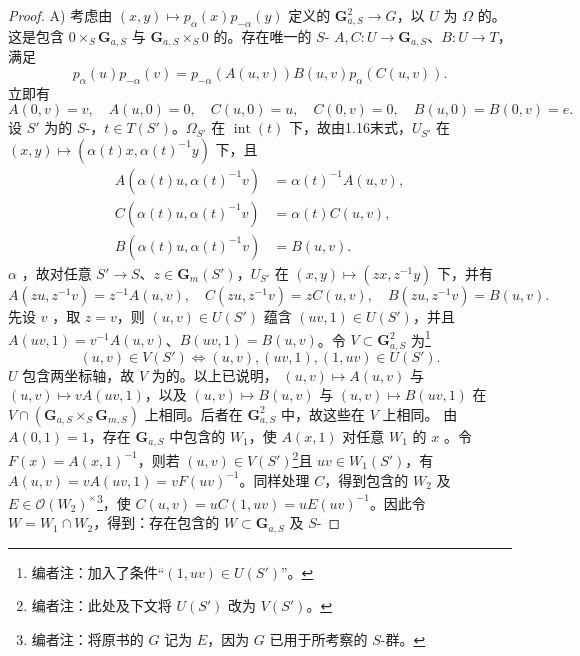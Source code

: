 \begin{proof}
A) 考虑由 $(x,y)\mapsto p_\alpha(x)p_{-\alpha}(y)$ 定义的 $\mathbf G_{a,S}^2\to G$，以 $U$ 为 $\Omega$ 的。这是包含 $0\times_S\mathbf G_{a,S}$ 与 $\mathbf G_{a,S}\times_S0$ 的。存在唯一的 $S$- $A,C:U\to\mathbf G_{a,S}$、$B:U\to T$，满足
\[p_\alpha(u)p_{-\alpha}(v)=p_{-\alpha}(A(u,v))B(u,v)p_\alpha(C(u,v)).\]
立即有
\[A(0,v)=v,\quad A(u,0)=0,\quad C(u,0)=u,\quad C(0,v)=0,\quad B(u,0)=B(0,v)=e.\]
设 $S'$ 为的 $S$-，$t\in T(S')$。$\Omega_{S'}$ 在 $\operatorname{int}(t)$ 下，故由1.16末式，$U_{S'}$ 在 $(x,y)\mapsto(\alpha(t)x,\alpha(t)^{-1}y)$ 下，且
\[\begin{aligned}A(\alpha(t)u,\alpha(t)^{-1}v)&=\alpha(t)^{-1}A(u,v),\\C(\alpha(t)u,\alpha(t)^{-1}v)&=\alpha(t)C(u,v),\\B(\alpha(t)u,\alpha(t)^{-1}v)&=B(u,v).\end{aligned}\]
$\alpha$ ，故对任意 $S'\to S$、$z\in\mathbf G_m(S')$，$U_{S'}$ 在 $(x,y)\mapsto(zx,z^{-1}y)$ 下，并有
\[A(zu,z^{-1}v)=z^{-1}A(u,v),\quad C(zu,z^{-1}v)=zC(u,v),\quad B(zu,z^{-1}v)=B(u,v).\]
先设 $v$ ，取 $z=v$，则 $(u,v)\in U(S')$ 蕴含 $(uv,1)\in U(S')$，并且 $A(uv,1)=v^{-1}A(u,v)$、$B(uv,1)=B(u,v)$。令 $V\subset\mathbf G_{a,S}^2$ 为\footnote{编者注：加入了条件“$(1,uv)\in U(S')$”。}
\[(u,v)\in V(S')\Longleftrightarrow(u,v),(uv,1),(1,uv)\in U(S').\]
$U$ 包含两坐标轴，故 $V$ 为的。以上已说明， $(u,v)\mapsto A(u,v)$ 与 $(u,v)\mapsto vA(uv,1)$，以及 $(u,v)\mapsto B(u,v)$ 与 $(u,v)\mapsto B(uv,1)$ 在 $V\cap(\mathbf G_{a,S}\times_S\mathbf G_{m,S})$ 上相同。后者在 $\mathbf G_{a,S}^2$ 中，故这些在 $V$ 上相同。
由 $A(0,1)=1$，存在 $\mathbf G_{a,S}$ 中包含的 $W_1$，使 $A(x,1)$ 对任意 $W_1$ 的 $x$ 。令 $F(x)=A(x,1)^{-1}$，则若 $(u,v)\in V(S')$\footnote{编者注：此处及下文将 $U(S')$ 改为 $V(S')$。}且 $uv\in W_1(S')$，有 $A(u,v)=vA(uv,1)=vF(uv)^{-1}$。同样处理 $C$，得到包含的 $W_2$ 及 $E\in\mathscr O(W_2)^\times$\footnote{编者注：将原书的 $G$ 记为 $E$，因为 $G$ 已用于所考察的 $S$-群。}，使 $C(u,v)=uC(1,uv)=uE(uv)^{-1}$。因此令 $W=W_1\cap W_2$，得到：存在包含的 $W\subset\mathbf G_{a,S}$ 及 $S$-

\end{proof}
